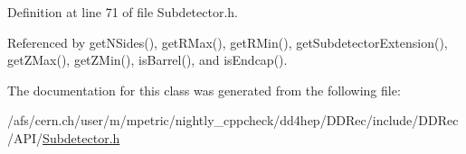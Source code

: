 Definition at line 71 of file Subdetector.h.

Referenced by getNSides(), getRMax(), getRMin(), getSubdetectorExtension(), getZMax(), getZMin(), isBarrel(), and isEndcap().

The documentation for this class was generated from the following file:\begin{DoxyCompactItemize}
\item 
/afs/cern.ch/user/m/mpetric/nightly\_\-cppcheck/dd4hep/DDRec/include/DDRec/API/\hyperlink{_subdetector_8h}{Subdetector.h}\end{DoxyCompactItemize}
